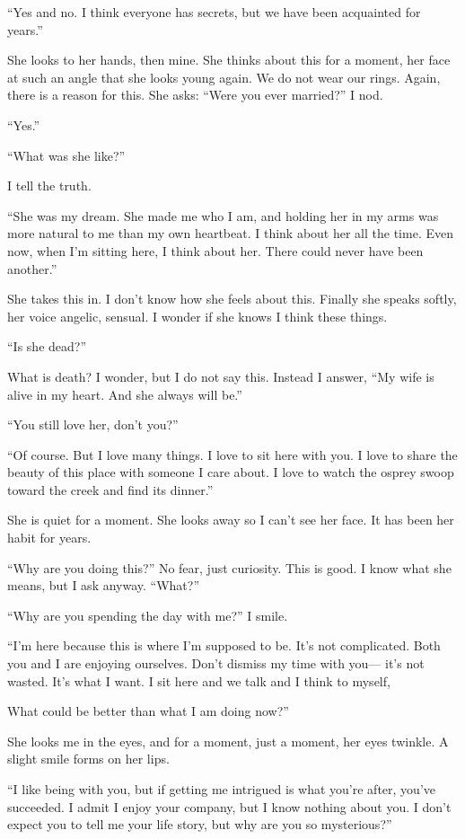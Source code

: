 \documentclass[10pt, twoside, openright]{book}
\begin{document}
``Yes and no. I think everyone has secrets, but we have been acquainted
for years.''

She looks to her hands, then mine. She thinks about this for a moment,
her face at such an angle that she looks young again. We do not wear our
rings. Again, there is a reason for this. She asks: ``Were you ever
married?'' I nod.


``Yes.''

``What was she like?''

I tell the truth.


``She was my dream. She made me who I am, and holding her in my arms was
more natural to me than my own heartbeat. I think about her all the
time. Even now, when I'm sitting here, I think about her. There could
never have been another.''

She takes this in. I don't know how she feels about this. Finally she
speaks softly, her voice angelic, sensual. I wonder if she knows I think
these things.


``Is she dead?''


What is death? I wonder, but I do not say this. Instead I answer, ``My
wife is alive in my heart. And she always will be.''


``You still love her, don't you?''


``Of course. But I love many things. I love to sit here with you. I love
to share the beauty of this place with someone I care about. I love to
watch the osprey swoop toward the creek and find its dinner.''

She is quiet for a moment. She looks away so I can't see her face. It
has been her habit for years.

``Why are you doing this?'' No fear, just curiosity. This is good. I
know what she means, but I ask anyway. ``What?''


``Why are you spending the day with me?'' I smile.


``I'm here because this is where I'm supposed to be. It's not
complicated. Both you and I are enjoying ourselves. Don't dismiss my
time with you--- it's not wasted. It's what I want. I sit here and we
talk and I think to myself,

What could be better than what I am doing now?''

She looks me in the eyes, and for a moment, just a moment, her eyes
twinkle. A slight smile forms on her lips.

``I like being with you, but if getting me intrigued is what you're
after, you've succeeded. I admit I enjoy your company, but I know
nothing about you. I don't expect you to tell me your life story, but
why are you so mysterious?''
\end{document}
